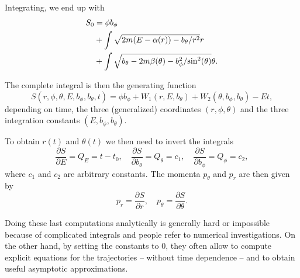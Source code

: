 \documentclass[english,fontsize=11pt,paper=a5,oneside]{scrbook}
\let\d\relax
\newcommand{\d}{\mathrm{d}}
\theoremstyle{definition}
\newenvironment{example}
  {\pushQED{\qed}\renewcommand{\qedsymbol}{$\lozenge$}\examplex}
  {\popQED\endexamplex}
\begin{document}
\begin{example}
  Integrating, we end up with
  \begin{align}
    S_0 & = \phi b_\phi                                                               \\
        & + \int\sqrt{2m(E-\alpha(r))-{b_\theta}/{r^2}}\d r                           \\
        & + \int\sqrt{b_\theta-2m\beta(\theta)-{b_\phi^2}/{\sin^2(\theta)}}\d \theta. \\
  \end{align}

  The complete integral is then the generating function
  \begin{equation}
    S(r,\phi,\theta,E,b_\phi,b_\theta,t) =
    \phi b_\phi
    + W_1(r, E, b_\theta)
    + W_2(\theta, b_\phi, b_\theta)
    - E t,
  \end{equation}
  depending on time, the three (generalized) coordinates $(r,\phi,\theta)$ and the three integration constants $(E,b_\phi,b_\theta)$.

  To obtain $r(t)$ and $\theta(t)$ we then need to invert the integrals
  \begin{equation}
    \frac{\partial S}{\partial E} = Q_E = t-t_0, \quad
    \frac{\partial S}{\partial b_\theta} = Q_\theta = c_1, \quad
    \frac{\partial S}{\partial b_\phi} = Q_\phi = c_2,
  \end{equation}
  where $c_1$ and $c_2$ are arbitrary constants.
  The momenta $p_\theta$ and $p_r$ are then given by
  \begin{equation}
    p_r = \frac{\partial S}{\partial r}, \quad
    p_\theta = \frac{\partial S}{\partial \theta}.
  \end{equation}

  Doing these last computations analytically is generally hard or impossible because of complicated integrals and people refer to numerical investigations.
  On the other hand, by setting the constants to $0$, they often allow to compute explicit equations for the trajectories -- without time dependence -- and to obtain useful asymptotic approximations.
\end{example}
\end{document}
